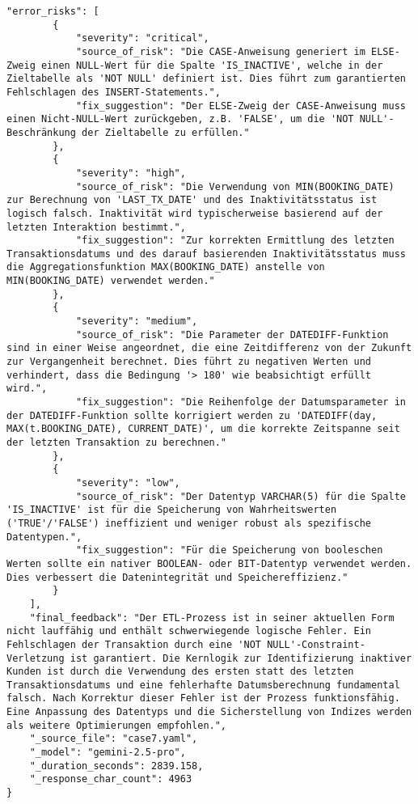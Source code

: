 \begin{lstlisting}[caption={Ausgabe: GEMINI 2.5 Pro Anwendungsfall 7 Robustheitsdurchlauf},label={gemini_case7_prompt3}]
    "error_risks": [
        {
            "severity": "critical",
            "source_of_risk": "Die CASE-Anweisung generiert im ELSE-Zweig einen NULL-Wert für die Spalte 'IS_INACTIVE', welche in der Zieltabelle als 'NOT NULL' definiert ist. Dies führt zum garantierten Fehlschlagen des INSERT-Statements.",
            "fix_suggestion": "Der ELSE-Zweig der CASE-Anweisung muss einen Nicht-NULL-Wert zurückgeben, z.B. 'FALSE', um die 'NOT NULL'-Beschränkung der Zieltabelle zu erfüllen."
        },
        {
            "severity": "high",
            "source_of_risk": "Die Verwendung von MIN(BOOKING_DATE) zur Berechnung von 'LAST_TX_DATE' und des Inaktivitätsstatus ist logisch falsch. Inaktivität wird typischerweise basierend auf der letzten Interaktion bestimmt.",
            "fix_suggestion": "Zur korrekten Ermittlung des letzten Transaktionsdatums und des darauf basierenden Inaktivitätsstatus muss die Aggregationsfunktion MAX(BOOKING_DATE) anstelle von MIN(BOOKING_DATE) verwendet werden."
        },
        {
            "severity": "medium",
            "source_of_risk": "Die Parameter der DATEDIFF-Funktion sind in einer Weise angeordnet, die eine Zeitdifferenz von der Zukunft zur Vergangenheit berechnet. Dies führt zu negativen Werten und verhindert, dass die Bedingung '> 180' wie beabsichtigt erfüllt wird.",
            "fix_suggestion": "Die Reihenfolge der Datumsparameter in der DATEDIFF-Funktion sollte korrigiert werden zu 'DATEDIFF(day, MAX(t.BOOKING_DATE), CURRENT_DATE)', um die korrekte Zeitspanne seit der letzten Transaktion zu berechnen."
        },
        {
            "severity": "low",
            "source_of_risk": "Der Datentyp VARCHAR(5) für die Spalte 'IS_INACTIVE' ist für die Speicherung von Wahrheitswerten ('TRUE'/'FALSE') ineffizient und weniger robust als spezifische Datentypen.",
            "fix_suggestion": "Für die Speicherung von booleschen Werten sollte ein nativer BOOLEAN- oder BIT-Datentyp verwendet werden. Dies verbessert die Datenintegrität und Speichereffizienz."
        }
    ],
    "final_feedback": "Der ETL-Prozess ist in seiner aktuellen Form nicht lauffähig und enthält schwerwiegende logische Fehler. Ein Fehlschlagen der Transaktion durch eine 'NOT NULL'-Constraint-Verletzung ist garantiert. Die Kernlogik zur Identifizierung inaktiver Kunden ist durch die Verwendung des ersten statt des letzten Transaktionsdatums und eine fehlerhafte Datumsberechnung fundamental falsch. Nach Korrektur dieser Fehler ist der Prozess funktionsfähig. Eine Anpassung des Datentyps und die Sicherstellung von Indizes werden als weitere Optimierungen empfohlen.",
    "_source_file": "case7.yaml",
    "_model": "gemini-2.5-pro",
    "_duration_seconds": 2839.158,
    "_response_char_count": 4963
}
\end{lstlisting}

